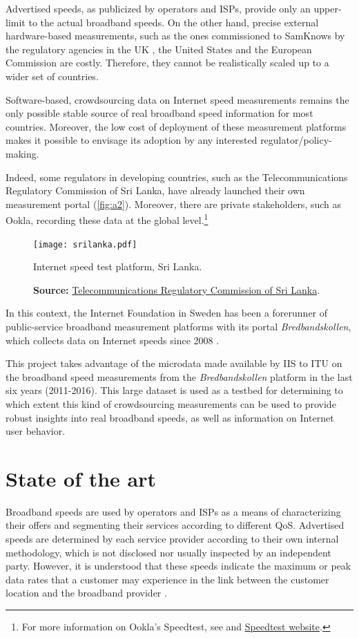 \documentclass[12pt]{article}
\begin{document}
Advertised speeds, as publicized by operators and ISPs, provide only an upper-limit to the actual broadband speeds. On the other hand, precise external hardware-based measurements, such as the ones commissioned to SamKnows by the regulatory agencies in the UK \citep{ofcom2017}, the United States \citep{fcc2015b} and the European Commission \citep{samknows2013} are costly. Therefore, they cannot be realistically scaled up to a wider set of countries.  

Software-based, crowdsourcing data on Internet speed measurements remains the only possible stable source of real broadband speed information for most countries. Moreover, the low cost of deployment of these measurement platforms makes it possible to envisage its adoption by any interested regulator/policy-making. 

Indeed, some regulators in developing countries, such as the Telecommunications Regulatory Commission of Sri Lanka, have already launched their own measurement portal (\autoref{fig:a2}). Moreover, there are private stakeholders, such as Ookla, recording these data at the global level.\footnote{For more information on Ookla's Speedtest, see  and \href{http://beta.speedtest.net/about}{Speedtest website}.} 

\begin{figure}[H]
    \centering
        \texttt{[image: srilanka.pdf]}
        \caption{Internet speed test platform,  Sri Lanka.}
        \caption*{\textbf{Source:} \href{http://www.trc.gov.lk/2014-05-12-13-25-54/internet-speed-test.html}{Telecommunications Regulatory Commission of Sri Lanka}.}
        \label{fig:a2}
\end{figure}   

In this context, the Internet Foundation in Sweden has been a forerunner of public-service broadband measurement platforms with its portal \textit{Bredbandskollen}, which collects data on Internet speeds since 2008 \citep{bredbandskollen}.   

This project takes advantage of the microdata made available by IIS to ITU on the broadband speed measurements from the \textit{Bredbandskollen} platform in the last six years (2011-2016). This large dataset is used as a testbed for determining to which extent this kind of crowdsourcing measurements can be used to provide robust insights into real broadband speeds, as well as information on Internet user behavior.  

\section{State of the art}
Broadband speeds are used by operators and ISPs as a means of characterizing their offers and segmenting their services according to different QoS. Advertised speeds are determined by each service provider according to their own internal methodology, which is not disclosed nor usually inspected by an independent party. However, it is understood that these speeds indicate the maximum or peak data rates that a customer may experience in the link between the customer location and the broadband provider \citep{bauer2010}.
\end{document}
